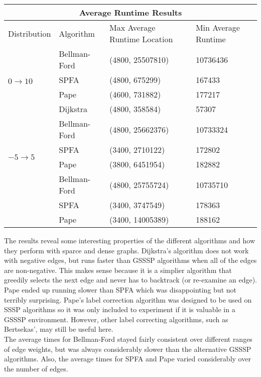 \documentclass{article}
\begin{document}
\begin{center}
	\begin{tabular}{|p{1.75cm}|p{2.25cm}|p{3cm}|p{2cm}|}
		\hline
		\multicolumn{4}{|c|}{Average Runtime Results} \\
		\hline
		Distribution	&	Algorithm	&	Max Average Runtime	Location	&	Min Average Runtime\\
		\hline
		\multirow{4}{4em}{$0 \rightarrow 10$}
			&	Bellman-Ford 		& 	(4800, 25507810) &10736436\\ 
			& 	SPFA 				& 	(4800, 675299)  &167433\\  
			& 	Pape 				& 	(4600, 731882)  &177217\\
			&	Dijkstra			&  	(4800, 358584)  &57307\\
		\hline
		\multirow{4}{4em}{$-5 \rightarrow 5$}
			& 	Bellman-Ford	& 	(4800, 25662376) &10733324\\  
			& 	SPFA 			& 	(3400, 2710122) &172802\\
			&	Pape			&  	(3800, 6451954) &182882\\
		\hline
		\multirow{4}{4em}{$-10 \rightarrow 0$}
			& 	Bellman-Ford	& 	(4800, 25755724) &10735710\\  
			& 	SPFA 			& 	(3400, 3747549) &178363\\
			&	Pape			&  	(3400, 14005389) &188162\\
		\hline
	\end{tabular}
\end{center}

The results reveal some interesting properties of the different algorithms and how they perform with sparce and dense graphs. Dijkstra's algorithm does not work with negative edges, but runs faster than GSSSP algorithms when all of the edges are non-negative. This makes sense because it is a simplier algorithm that greedily selects the next edge and never has to backtrack (or re-examine an edge). Pape ended up running slower than SPFA which was disappointing but not terribly surprising. Pape's label correction algorithm was designed to be used on SSSP algorithms so it was only included to experiment if it is valuable in a GSSSP environment. However, other label correcting algorithms, such as Bertsekas', may still be useful here.\\
The average times for Bellman-Ford stayed fairly consistent over different ranges of edge weights, but was always considerably slower than the alternative GSSSP algorithms. Also, the average times for SPFA and Pape varied considerably over the number of edges. 
\end{document}
